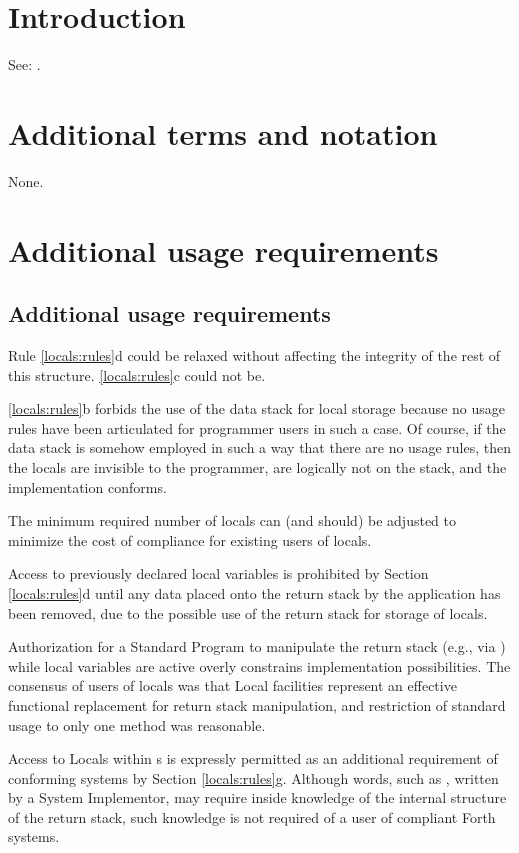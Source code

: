 \section{Introduction} %

See: .

\section{Additional terms and notation} %

None.

\section{Additional usage requirements} %

\begin{intro}
\subsection{Additional usage requirements} %

Rule \ref{locals:rules}d could be relaxed without affecting the
integrity of the rest of this structure. \ref{locals:rules}c could
not be.

\ref{locals:rules}b forbids the use of the data stack for local
storage because no usage rules have been articulated for programmer
users in such a case. Of course, if the data stack is somehow employed
in such a way that there are no usage rules, then the locals are
invisible to the programmer, are logically not on the stack, and the
implementation conforms.

The minimum required number of locals can (and should) be adjusted to
minimize the cost of compliance for existing users of locals.

Access to previously declared local variables is prohibited by Section
\ref{locals:rules}d until any data placed onto the return stack by the
application has been removed, due to the possible use of the return
stack for storage of locals.

Authorization for a Standard Program to manipulate the return stack
(e.g., via  ) while local variables
are active overly constrains implementation possibilities. The consensus
of users of locals was that Local facilities represent an effective
functional replacement for return stack manipulation, and restriction
of standard usage to only one method was reasonable.

Access to Locals within s is
expressly permitted as an additional requirement of conforming systems
by Section \ref{locals:rules}g. Although words, such as ,
written by a System Implementor, may require inside knowledge of the
internal structure of the return stack, such knowledge is not required
of a user of compliant Forth systems.
\end{intro}


